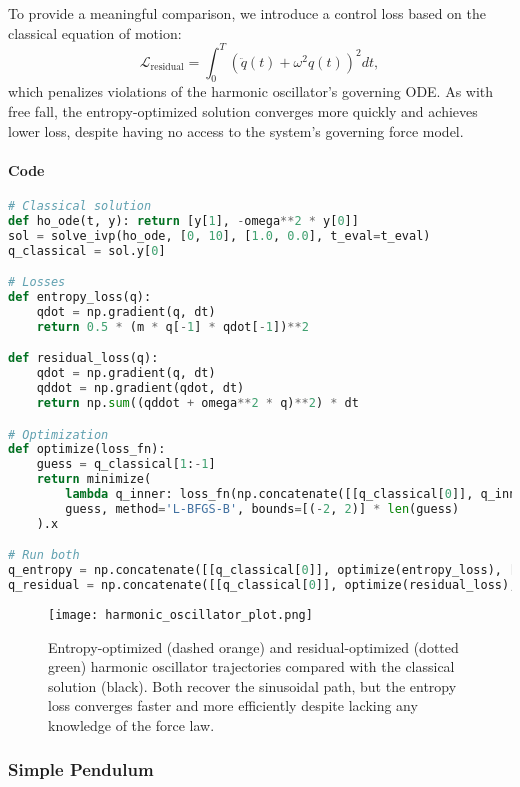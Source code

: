 \documentclass[12pt]{article}
\begin{document}
To provide a meaningful comparison, we introduce a control loss based on the classical equation of motion:
\[
\mathcal{L}_{\text{residual}} = \int_0^T \left(\ddot{q}(t) + \omega^2 q(t)\right)^2 dt,
\]
which penalizes violations of the harmonic oscillator's governing ODE. As with free fall, the entropy-optimized solution converges more quickly and achieves lower loss, despite having no access to the system’s governing force model.

\paragraph*{Code}\mbox{}
\begin{lstlisting}[language=Python]
# Classical solution
def ho_ode(t, y): return [y[1], -omega**2 * y[0]]
sol = solve_ivp(ho_ode, [0, 10], [1.0, 0.0], t_eval=t_eval)
q_classical = sol.y[0]

# Losses
def entropy_loss(q): 
    qdot = np.gradient(q, dt)
    return 0.5 * (m * q[-1] * qdot[-1])**2

def residual_loss(q): 
    qdot = np.gradient(q, dt)
    qddot = np.gradient(qdot, dt)
    return np.sum((qddot + omega**2 * q)**2) * dt

# Optimization
def optimize(loss_fn):
    guess = q_classical[1:-1]
    return minimize(
        lambda q_inner: loss_fn(np.concatenate([[q_classical[0]], q_inner, [q_classical[-1]]])),
        guess, method='L-BFGS-B', bounds=[(-2, 2)] * len(guess)
    ).x

# Run both
q_entropy = np.concatenate([[q_classical[0]], optimize(entropy_loss), [q_classical[-1]]])
q_residual = np.concatenate([[q_classical[0]], optimize(residual_loss), [q_classical[-1]]])
\end{lstlisting}

\begin{figure}[H]
\centering
\texttt{[image: harmonic\_oscillator\_plot.png]}
\caption{
Entropy-optimized (dashed orange) and residual-optimized (dotted green) harmonic oscillator trajectories compared with the classical solution (black). Both recover the sinusoidal path, but the entropy loss converges faster and more efficiently despite lacking any knowledge of the force law.
}
\end{figure}


\subsubsection{Simple Pendulum}
\end{document}
